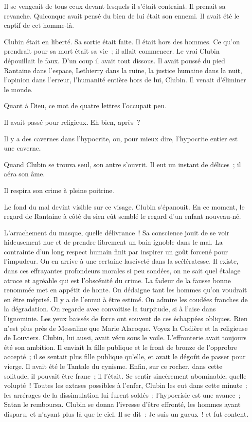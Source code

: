 \documentclass[french,twoside]{book} %
\begin{document}
Il se vengeait de tous ceux devant lesquels il s’était  contraint. Il prenait sa revanche. Quiconque avait pensé du bien de lui était son ennemi. Il avait été le captif de cet homme-là.\par
Clubin était en liberté. Sa sortie était faite. Il était hors des hommes. Ce qu’on prendrait pour sa mort était sa vie ; il allait commencer. Le vrai Clubin dépouillait le faux. D’un coup il avait tout dissous. Il avait poussé du pied Rantaine dans l’espace, Lethierry dans la ruine, la justice humaine dans la nuit, l’opinion dans l’erreur, l’humanité entière hors de lui, Clubin. Il venait d’éliminer le monde.\par
Quant à Dieu, ce mot de quatre lettres l’occupait peu.\par
Il avait passé pour religieux. Eh bien, après ?\par
Il y a des cavernes dans l’hypocrite, ou, pour mieux dire, l’hypocrite entier est une caverne.\par
Quand Clubin se trouva seul, son antre s’ouvrit. Il eut un instant de délices ; il aéra son âme.\par
Il respira son crime à pleine poitrine.\par
Le fond du mal devint visible sur ce visage. Clubin s’épanouit. En ce moment, le regard de Rantaine à côté du sien eût semblé le regard d’un enfant nouveau-né.\par
L’arrachement du masque, quelle délivrance ! Sa conscience jouit de se voir hideusement nue et de prendre librement un bain ignoble dans le mal. La contrainte d’un long respect humain finit par inspirer un goût forcené pour l’impudeur. On en arrive à une certaine lasciveté dans la scélératesse. Il existe, dans ces effrayantes profondeurs morales si peu sondées,  on ne sait quel étalage atroce et agréable qui est l’obscénité du crime. La fadeur de la fausse bonne renommée met en appétit de honte. On dédaigne tant les hommes qu’on voudrait en être méprisé. Il y a de l’ennui à être estimé. On admire les coudées franches de la dégradation. On regarde avec convoitise la turpitude, si à l’aise dans l’ignominie. Les yeux baissés de force ont souvent de ces échappées obliques. Rien n’est plus près de Messaline que Marie Alacoque. Voyez la Cadière et la religieuse de Louviers. Clubin, lui aussi, avait vécu sous le voile. L’effronterie avait toujours été son ambition. Il enviait la fille publique et le front de bronze de l’opprobre accepté ; il se sentait plus fille publique qu’elle, et avait le dégoût de passer pour vierge. Il avait été le Tantale du cynisme. Enfin, sur ce rocher, dans cette solitude, il pouvait être franc ; il l’était. Se sentir sincèrement abominable, quelle volupté ! Toutes les extases possibles à l’enfer, Clubin les eut dans cette minute ; les arrérages de la dissimulation lui furent soldés ; l’hypocrisie est une avance ; Satan le remboursa. Clubin se donna l’ivresse d’être effronté, les hommes ayant disparu, et n’ayant plus là que le ciel. Il se dit : Je suis un gueux ! et fut content.\par
\end{document}

